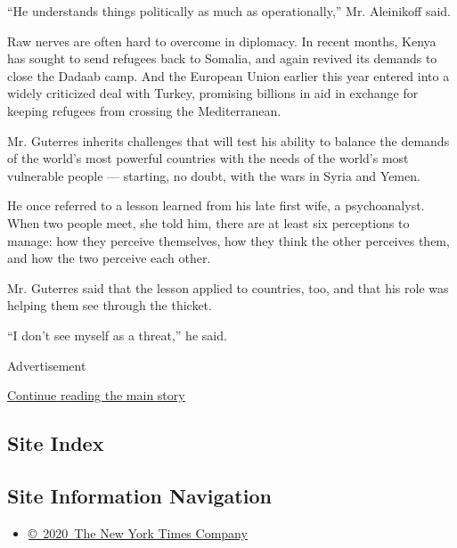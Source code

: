 ``He understands things politically as much as operationally,'' Mr.
Aleinikoff said.

Raw nerves are often hard to overcome in diplomacy. In recent months,
Kenya has sought to send refugees back to Somalia, and again revived its
demands to close the Dadaab camp. And the European Union earlier this
year entered into a widely criticized deal with Turkey, promising
billions in aid in exchange for keeping refugees from crossing the
Mediterranean.

Mr. Guterres inherits challenges that will test his ability to balance
the demands of the world's most powerful countries with the needs of the
world's most vulnerable people --- starting, no doubt, with the wars in
Syria and Yemen.

He once referred to a lesson learned from his late first wife, a
psychoanalyst. When two people meet, she told him, there are at least
six perceptions to manage: how they perceive themselves, how they think
the other perceives them, and how the two perceive each other.

Mr. Guterres said that the lesson applied to countries, too, and that
his role was helping them see through the thicket.

``I don't see myself as a threat,'' he said.

Advertisement

\protect\hyperlink{after-bottom}{Continue reading the main story}

\hypertarget{site-index}{%
\subsection{Site Index}\label{site-index}}

\hypertarget{site-information-navigation}{%
\subsection{Site Information
Navigation}\label{site-information-navigation}}

\begin{itemize}
\tightlist
\item
  \href{https://help.nytimes.com/hc/en-us/articles/115014792127-Copyright-notice}{©~2020~The
  New York Times Company}
\end{itemize}

